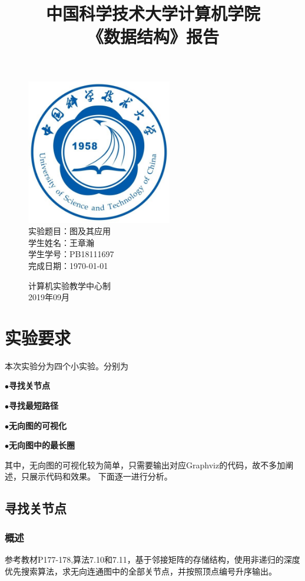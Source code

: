 \documentclass[UTF8]{article}
\title{中国科学技术大学计算机学院\\《数据结构》报告}
\author{}
\date{}
\newcommand{\keypoint}[1]{$\bullet$\textbf{#1}\par}
\begin{document}
\maketitle
	\begin{figure}[H]
		\centering
		\includegraphics[width=2.5in]{xiaohui.jpg}\vspace{0.5cm}\\
		\large{
			实验题目：图及其应用\\
			学生姓名：王章瀚\\
			学生学号：PB18111697\\
			完成日期：\today\\
		}\vspace{2cm}
		
		\large{计算机实验教学中心制\\2019年09月\\}
		\thispagestyle{empty}
		\clearpage  %
	\end{figure}
	\newpage
	
	\section{实验要求}
	本次实验分为四个小实验。分别为\par
	\keypoint{寻找关节点}
	\keypoint{寻找最短路径}
	\keypoint{无向图的可视化}
	\keypoint{无向图中的最长圈}
	其中，无向图的可视化较为简单，只需要输出对应Graphviz的代码，故不多加阐述，只展示代码和效果。
	下面逐一进行分析。\par
	
	\subsection{寻找关节点}
	\subsubsection{概述}
	参考教材P177-178,算法7.10和7.11，基于邻接矩阵的存储结构，使用非递归的深度优先搜索算法，求无向连通图中的全部关节点，并按照顶点编号升序输出。\par
\end{document}
